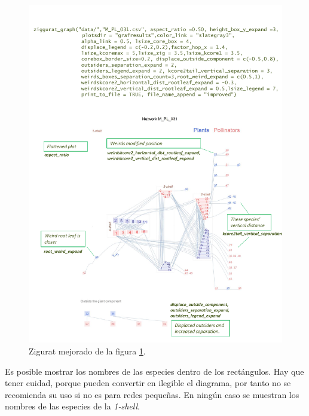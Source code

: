 \clearpage
\begin{figure}[hp!]
\centering
\includegraphics[scale=0.8]{ManFigs/M_PL_031_ziggurat_improved.pdf}
\caption {Zigurat mejorado de la figura \ref{fig:AKMAN_ziggurat_031}.}
\label{fig:AKMAN_ziggurat_031}
\end{figure}


\clearpage
Es posible mostrar los nombres de las especies dentro de los rectángulos. Hay que tener cuidad, porque pueden convertir
en ilegible el diagrama, por tanto no se recomienda su uso si no es para redes pequeñas. En ningún caso se muestran los
nombres de las especies de la \textit{1-shell}.

